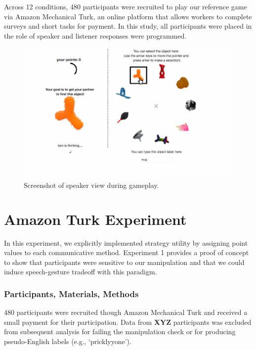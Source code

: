 \documentclass[10pt, letterpaper]{article}
\newenvironment{CodeChunk}{}{}
\begin{document}
Across 12 conditions, 480 participants were recruited to play our
reference game via Amazon Mechanical Turk, an online platform that
allows workers to complete surveys and short tasks for payment. In this
study, all participants were placed in the role of speaker and listener
responses were programmed.

\begin{CodeChunk}
\begin{figure}[H]

{\centering \includegraphics{figs/imp_screenshot-1} 

}

\caption[Screenshot of speaker view during gameplay]{Screenshot of speaker view during gameplay.}\label{fig:imp_screenshot}
\end{figure}
\end{CodeChunk}

\section{Amazon Turk Experiment}\label{amazon-turk-experiment}

In this experiment, we explicitly implemented strategy utility by
assigning point values to each communicative method. Experiment 1
provides a proof of concept to show that participants were sensitive to
our manipulation and that we could induce speech-gesture tradeoff with
this paradigm.

\subsubsection{Participants, Materials,
Methods}\label{participants-materials-methods-1}

480 participants were recruited though Amazon Mechanical Turk and
received a small payment for their participation. Data from \textbf{XYZ}
participants was excluded from subsequent analysis for failing the
manipulation check or for producing pseudo-English labels (e.g.,
`pricklyyone').
\end{document}
